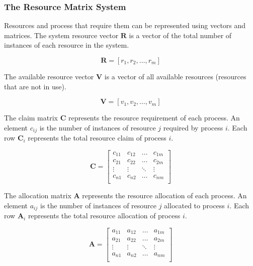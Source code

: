 \subsubsection{The Resource Matrix System}

Resources and process that require them can be represented using vectors and matrices.
The system resource vector \( \mathbf{R} \) is a vector of the total number of instances of each resource in the system.

\begin{equation*}
  \mathbf{R} = \left[ r_1, r_2, \ldots, r_m \right]
\end{equation*}

The available resource vector \( \mathbf{V} \) is a vector of all available resources (resources that are not in use).

\begin{equation*}
  \mathbf{V} = \left[ v_1, v_2, \ldots, v_m \right]
\end{equation*}

The claim matrix \( \mathbf{C} \) represents the resource requirement of each process.
An element \( c_{ij} \) is the number of instances of resource \( j \) required by process \( i \).
Each row \( \mathbf{C}_i \) represents the total resource claim of process \( i \).

\begin{equation*}
  \mathbf{C} = \begin{bmatrix}
    c_{11} & c_{12} & \ldots & c_{1m} \\
    c_{21} & c_{22} & \ldots & c_{2m} \\
    \vdots & \vdots & \ddots & \vdots \\
    c_{n1} & c_{n2} & \ldots & c_{nm} \\
  \end{bmatrix}
\end{equation*}

The allocation matrix \( \mathbf{A} \) represents the resource allocation of each process.
An element \( a_{ij} \) is the number of instances of resource \( j \) allocated to process \( i \).
Each row \( \mathbf{A}_i \) represents the total resource allocation of process \( i \).

\begin{equation*}
  \mathbf{A} = \begin{bmatrix}
    a_{11} & a_{12} & \ldots & a_{1m} \\
    a_{21} & a_{22} & \ldots & a_{2m} \\
    \vdots & \vdots & \ddots & \vdots \\
    a_{n1} & a_{n2} & \ldots & a_{nm} \\
  \end{bmatrix}
\end{equation*}

